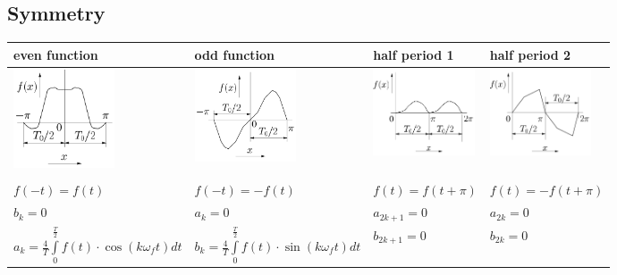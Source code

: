 	\subsection{Symmetry}
		\begin{tabular}{|p{4.3cm}|p{4.3cm}|p{4.4cm}|p{4.4cm}|}
         	\hline
        	\textbf{even function} & \textbf{odd function} &
        	\textbf{half period 1} & \textbf{half period 2}\\
        	\hline
        	\includegraphics[width=3cm]{Content/03_transforms/gerade_funktion.png}&
        	\includegraphics[width=3cm]{Content/03_transforms/ungerade_funktion.png}&
 			\includegraphics[width=3cm]{Content/03_transforms/halbperiode_1.png}&
			\includegraphics[width=3cm]{Content/03_transforms/halbperiode_2.png}\\
			\hline & & & \\
   			$f(-t)=f(t)$ & $f(-t)=-f(t)$ & $f(t)=f(t+\pi)$ & $f(t)=-f(t+\pi)$\\
   			$b_k=0$ & $a_k=0$ & $a_{2k+1}=0$ & $a_{2k}=0$\\
   			$a_k = \frac{4}{T} \int\limits_0^{\frac{T}{2}} f(t) \cdot \cos(k \omega_f
   			t) dt$ &
   			$b_k =  \frac{4}{T} \int\limits_0^{\frac{T}{2}} f(t) \cdot
			\sin(k \omega_f t) dt$ &
			$b_{2k+1}=0$ & $b_{2k}=0$\\
			\hline
      	\end{tabular}

